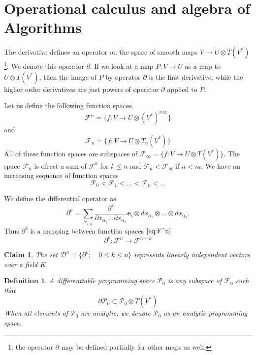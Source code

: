 \documentclass{article}
\newcommand{\e}{\mathbf{e}}
\newcommand{\F}{\mathcal{F}}
\newcommand{\dP}{\mathcal{P}}
\newcommand{\D}{\partial}
\newcommand{\DD}{\mathcal{D}}
\newtheorem{definicija}{Definition}[section]
\newtheorem{trditev}{Claim}[section]
\begin{document}
\section{Operational calculus and algebra of Algorithms}\label{sec:operational}

The derivative defines an operator on the space of smooth maps $V\to U\otimes
 T(V^*)$\footnote{the operator $\D$ may be defined partially for other maps as
   well.}. We denote this operator $\D$. If we look at a map $P:V\to U$ as a map
 to $U\otimes T(V^*)$, then the image of $P$ by operator $\D$ is the first
 derivative, while the higher order derivatives are just powers of operator $\D$
 applied to $P$. 

Let us define the following function spaces.
 \begin{equation}\label{eq:F^n}
 	\F^n=\{f:V\to U\otimes(V^*)^{n\otimes}\}
 \end{equation}
 and
 \begin{equation}\label{eq:F_n}
 	\F_n=\{f:V\to U\otimes T_n(V^*)\}
 \end{equation}
All of these function spaces are subspaces of $\F_\infty=\{f:V\to U\otimes
T(V^*)\}$. The space $\F_n$ is direct a sum of $\F^k$ for $k\le n$ and $\F_n<\F_m$ if $n<m$. We
have an increasing sequence of function spaces
\begin{equation}
  \label{eq:flag_function_space}
  \F_0<\F_1<\ldots<\F_n<\ldots
\end{equation}

We define the differential operator as
\begin{equation}\label{eq:dd}
	\partial^k=\sum_{\forall_{i,\alpha}}\frac{\partial^k}{\partial
	    x_{\alpha_1}\ldots \partial x_{\alpha_k}}\e_i\otimes
	  dx_{\alpha_1}\otimes\ldots \otimes dx_{\alpha_k}.
\end{equation}
Thus $\D^k$ is a mapping between function spaces $\eqref{eq:F^n}$
 \begin{equation}\label{eq:toFn+k}
 \D^k:\F^n\to\F^{n+k}
 \end{equation}
 
 \begin{trditev}\label{izr:linearnaNeodvisnost}
  The set $\DD^n=\{\partial^k;\quad 0\le k\le n\}$ represents linearly independent vectors over a field $K$.
 \end{trditev}
 
 \begin{definicija}\label{def:dP}
 	A \emph{differentiable programming space} $\dP_0$ is any subspace of $\F_0$ such that
 	\begin{equation}\label{eq:P}
 	\D\dP_0\subset\dP_0\otimes T(V^*)
 	\end{equation}
 	When all elements of $\dP_0$ are analytic, we denote $\dP_0$ as an \emph{analytic programming space}.
 \end{definicija}
\end{document}
